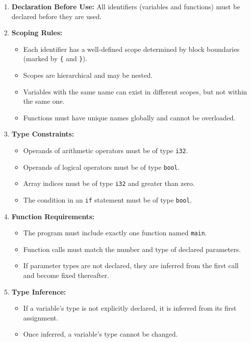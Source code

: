 \documentclass[12pt, a4paper]{report}
\begin{document}
\begin{enumerate}
    \item \textbf{Declaration Before Use:} All identifiers (variables and functions) must be declared before they are used.

    \item \textbf{Scoping Rules:} 
    \begin{itemize}
        \item Each identifier has a well-defined scope determined by block boundaries (marked by \texttt{\{} and \texttt{\}}).
        \item Scopes are hierarchical and may be nested.
        \item Variables with the same name can exist in different scopes, but not within the same one.
        \item Functions must have unique names globally and cannot be overloaded.
    \end{itemize}

    \item \textbf{Type Constraints:}
    \begin{itemize}
        \item Operands of arithmetic operators must be of type \texttt{i32}.
        \item Operands of logical operators must be of type \texttt{bool}.
        \item Array indices must be of type \texttt{i32} and greater than zero.
        \item The condition in an \texttt{if} statement must be of type \texttt{bool}.
    \end{itemize}

    \item \textbf{Function Requirements:}
    \begin{itemize}
        \item The program must include exactly one function named \texttt{main}.
        \item Function calls must match the number and type of declared parameters.
        \item If parameter types are not declared, they are inferred from the first call and become fixed thereafter.
    \end{itemize}

    \item \textbf{Type Inference:}
    \begin{itemize}
        \item If a variable's type is not explicitly declared, it is inferred from its first assignment.
        \item Once inferred, a variable’s type cannot be changed.
    \end{itemize}


\end{enumerate}
\end{document}
